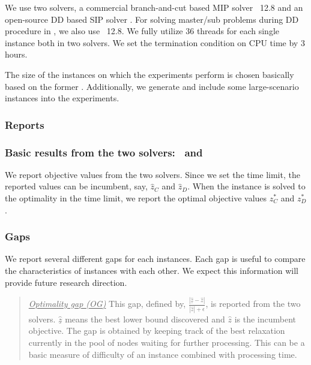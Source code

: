 We use two solvers, a commercial branch-and-cut based MIP solver \cplex\ 12.8 and an open-source DD based SIP solver \dsp. For solving master/sub problems during DD procedure in \dsp, we also use \cplex\ 12.8. We fully utilize 36 threads for each single instance both in two solvers. We set the termination condition on CPU time by 3 hours.  

The size of the instances on which the experiments perform is chosen basically based on the former \siplib. Additionally, we generate and include some large-scenario instances into the experiments.

\subsubsection{Reports}

\subsubsection {Basic results from the two solvers: \cplex\ and \dsp}
We report objective values from the two solvers. Since we set the time limit, the reported values can be incumbent, say, $\hat{z}_C$ and $\hat{z}_D$. When the instance is solved to the optimality in the time limit, we report the optimal objective values $z^*_C$ and $z^*_D$.

\subsubsection{Gaps}
We report several different gaps for each instances. Each gap is useful to compare the characteristics of instances with each other. We expect this information will provide future research direction. 

\begin{quote}
\noindent\underline{\textit{Optimality gap (OG)}} This gap, defined by, $\frac{|\underline{\hat{z}}-\hat{z}|}{|\hat{z}|+\epsilon}$, is reported from the two solvers. $\underline{\hat{z}}$ means the best lower bound discovered and $\hat{z}$ is the incumbent objective. The gap is obtained by keeping track of the best relaxation currently in the pool of nodes waiting for further processing. This can be a basic measure of difficulty of an instance combined with processing time.
\end{quote}

